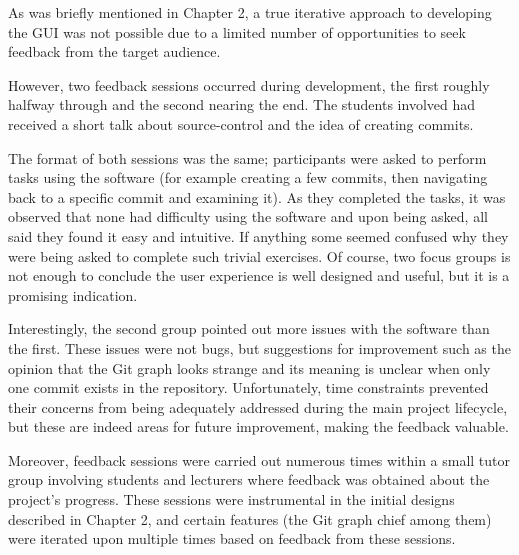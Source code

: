 As was briefly mentioned in Chapter 2, a true iterative approach to developing the GUI was not possible due to a limited number of opportunities to seek feedback from the target audience. 

However, two feedback sessions occurred during development, the first roughly halfway through and the second nearing the end. The students involved had received a short talk about source-control and the idea of creating commits.

The format of both sessions was the same; participants were asked to perform tasks using the software (for example creating a few commits, then navigating back to a specific commit and examining it). As they completed the tasks, it was observed that none had difficulty using the software and upon being asked, all said they found it easy and intuitive. If anything some seemed confused why they were being asked to complete such trivial exercises. Of course, two focus groups is not enough to conclude the user experience is well designed and useful, but it is a promising indication.

Interestingly, the second group pointed out more issues with the software than the first. These issues were not bugs, but suggestions for improvement such as the opinion that the Git graph looks strange and its meaning is unclear when only one commit exists in the repository. Unfortunately, time constraints prevented their concerns from being adequately addressed during the main project lifecycle, but these are indeed areas for future improvement, making the feedback valuable.

Moreover, feedback sessions were carried out numerous times within a small tutor group involving students and lecturers where feedback was obtained about the project's progress. These sessions were instrumental in the initial designs described in Chapter 2, and certain features (the Git graph chief among them) were iterated upon multiple times based on feedback from these sessions.


